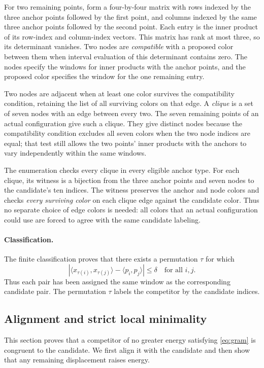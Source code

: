 \documentclass[11pt]{article}
\begin{document}
For two remaining points, form a four-by-four matrix with rows indexed
by the three anchor points followed by the first point, and columns
indexed by the same three anchor points followed by the second point.
Each entry is the inner product of its row-index and column-index vectors.
This matrix has rank at most three, so its
determinant vanishes. Two nodes are \emph{compatible} with a proposed
color between them when interval evaluation of this determinant contains
zero. The nodes specify the windows for inner products with the anchor points,
and the proposed color specifies the window for the one remaining entry.

Two nodes are adjacent when at least one color survives the compatibility condition, retaining
the list of all surviving colors on that edge. A \emph{clique} is a set
of seven nodes with an edge between every two. The seven remaining
points of an actual configuration give such a clique. They give distinct
nodes because the compatibility condition excludes all seven colors when the two node
indices are equal; that test still allows the two points' inner products
with the anchors to vary independently within the same windows.

The enumeration checks every clique in every eligible anchor type.
For each clique, its witness is a bijection from the three anchor points
and seven nodes to the candidate's ten indices. The witness preserves
the anchor and node colors and checks \emph{every surviving color} on
each clique edge against the candidate color. Thus no separate choice
of edge colors is needed: all colors that an actual configuration could
use are forced to agree with the same candidate labeling.

\paragraph{Classification.}
The finite classification proves that there exists a permutation
$\tau$ for which
\begin{equation}
 |\langle x_{\tau(i)},x_{\tau(j)}\rangle
       -\langle p_i,p_j\rangle|\leq\delta
 \quad\text{for all }i,j.\label{eq:gram}
\end{equation}
Thus each pair has been assigned the same window as the corresponding
candidate pair. The permutation $\tau$ labels the competitor by the candidate indices.
\subsection{Alignment and strict local minimality}\label{sec:local}
This section proves that a competitor of no greater energy satisfying
\eqref{eq:gram} is congruent to the candidate. We first align it with the
candidate and then show that any remaining displacement raises energy.
\end{document}
